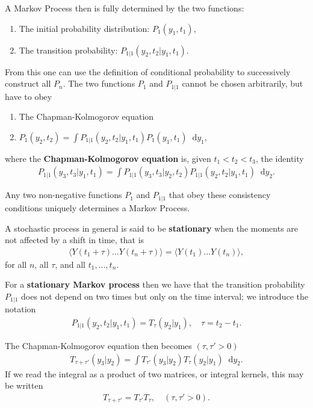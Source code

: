 \documentclass[twoside,english]{uiofysmaster}
\newcommand*\dif{\mathop{}\!\mathrm{d}}
\begin{document}
A Markov Process then is fully determined by the two functions:
\begin{enumerate}
	\item The initial probability distribution: $P_1 (y_1, t_1)$,
	\item The transition probability: $P_{1|1} (y_2, t_2| y_1, t_1)$. 
\end{enumerate}
From this one can use the definition of conditional probability to successively construct all $P_n$. The two functions $P_1$ and $P_{1|1}$ cannot be chosen arbitrarily, but have to obey
\begin{enumerate}
	\item The Chapman-Kolmogorov equation 
	\item $P_1(y_2, t_2) = \int P_{1|1} (y_2, t_2| y_1, t_1) P_1 (y_1, t_1) \dif y_1$,
\end{enumerate}
where the \textbf{Chapman-Kolmogorov equation} is, given $t_1 < t_2 < t_3$, the identity
\begin{align}
	P_{1|1} (y_3, t_3| y_1, t_1) = \int P_{1|1} (y_3, t_3|y_2, t_2) P_{1|1} (y_2, t_2 | y_1, t_1) \dif y_2.
\end{align}

Any two non-negative functions $P_1$ and $P_{1|1}$ that obey these
consistency conditions uniquely determines a Markov Process.

A stochastic process in general is said to be \textbf{stationary} when
the moments are not affected by a shift in time, that is
\begin{align}
	\langle Y(t_1 + \tau)...Y(t_n + \tau) \rangle = \langle Y(t_1 )...Y(t_n ) \rangle,
\end{align}
for all $n$, all $\tau$, and all $t_1, ..., t_n$.

For a \textbf{stationary Markov process} then we have that the transition probability $P_{1|1}$ does not depend on two times but only on the time interval; we introduce the notation
\begin{align}
	P_{1|1} (y_2, t_2| y_1, t_1) = T_\tau (y_2|y_1), \quad \tau = t_2 - t_1.
\end{align}

The Chapman-Kolmogorov equation then becomes $(\tau, \tau' > 0)$
\begin{align}
	T_{\tau+\tau'} (y_3 | y_2) = \int T_{\tau'} (y_3|y_2) T_\tau (y_2|y_1) \dif y_2.
\end{align}
If we read the integral as a product of two matrices, or integral kernels, this may be written
\begin{align}
	T_{\tau + \tau'} = T_{\tau'} T_{\tau}, \quad (\tau, \tau' > 0).
\end{align}
\end{document}
